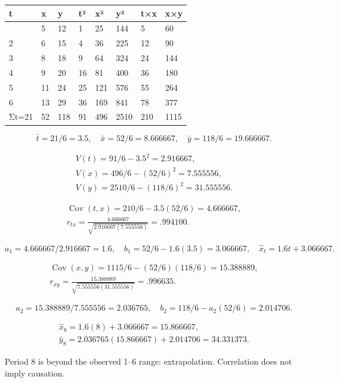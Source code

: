 \documentclass[11pt,a4paper]{article}
\begin{document}
\begin{longtable}[]{@{}llllllll@{}}
\toprule\noalign{}
t & x & y & t² & x² & y² & t×x & x×y \\
\midrule\noalign{}
\endhead
\bottomrule\noalign{}
\endlastfoot
1 & 5 & 12 & 1 & 25 & 144 & 5 & 60 \\
2 & 6 & 15 & 4 & 36 & 225 & 12 & 90 \\
3 & 8 & 18 & 9 & 64 & 324 & 24 & 144 \\
4 & 9 & 20 & 16 & 81 & 400 & 36 & 180 \\
5 & 11 & 24 & 25 & 121 & 576 & 55 & 264 \\
6 & 13 & 29 & 36 & 169 & 841 & 78 & 377 \\
Σt=21 & 52 & 118 & 91 & 496 & 2510 & 210 & 1115 \\
\end{longtable}

\[\bar t=21/6=3.5,\quad\bar x=52/6=8.666667,\quad\bar y=118/6=19.666667.\]

\[\begin{gathered}
V(t)=91/6-3.5^2=2.916667,\\V(x)=496/6-(52/6)^2=7.555556,\\V(y)=2510/6-(118/6)^2=31.555556.
\end{gathered}\]

\[\begin{gathered}
\operatorname{Cov}(t,x)=210/6-3.5(52/6)=4.666667,\\r_{tx}=\frac{4.666667}{\sqrt{2.916667(7.555556)}}=.994100.
\end{gathered}\]

\[a_1=4.666667/2.916667=1.6,\quad b_1=52/6-1.6(3.5)=3.066667,\quad\widehat x_t=1.6t+3.066667.\]

\[\begin{gathered}
\operatorname{Cov}(x,y)=1115/6-(52/6)(118/6)=15.388889,\\r_{xy}=\frac{15.388889}{\sqrt{7.555556(31.555556)}}=.996635.
\end{gathered}\]

\[a_2=15.388889/7.555556=2.036765,\quad b_2=118/6-a_2(52/6)=2.014706.\]

\[\begin{gathered}
\widehat x_8=1.6(8)+3.066667=15.866667,\\\widehat y_8=2.036765(15.866667)+2.014706=34.331373.
\end{gathered}\]

Period 8 is beyond the observed 1--6 range: extrapolation. Correlation does not imply causation.
\end{document}
